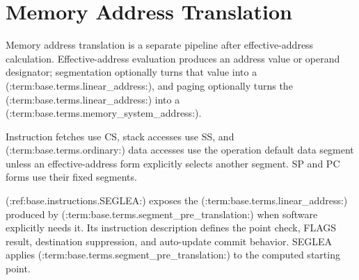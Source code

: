 \clearpage
\section{Memory Address Translation}\label{page:memory-address-translation}\label{section:memory-address-translation}

Memory address translation is a separate pipeline after effective-address calculation. Effective-address evaluation
produces an address value or operand designator; segmentation optionally turns that value into a (:term:base.terms.linear_address:), and
paging optionally turns the (:term:base.terms.linear_address:) into a (:term:base.terms.memory_system_address:).

Instruction fetches use CS, stack accesses use SS, and (:term:base.terms.ordinary:) data accesses use the operation default data segment
unless an effective-address form explicitly selects another segment. SP and PC forms use their fixed segments.

(:ref:base.instructions.SEGLEA:) exposes the (:term:base.terms.linear_address:) produced by (:term:base.terms.segment_pre_translation:) when
software explicitly needs it. Its instruction description defines the point check, FLAGS result, destination
suppression, and auto-update commit behavior. SEGLEA applies (:term:base.terms.segment_pre_translation:) to the computed starting point.


